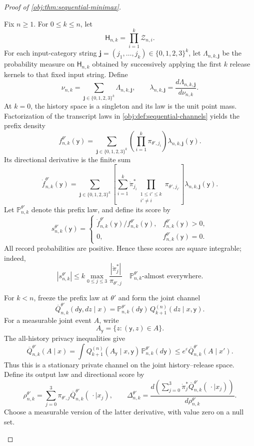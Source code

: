 \begin{proof}[Proof of \cref{obj:thm:sequential-minimax}]
\begin{enumerate}
Fix \(n\ge1\). For \(0\le k\le n\), let
\[
\mathsf H_{n,k}=\prod_{i=1}^{k}\mathcal Z_{n,i}.
\]
For each input-category string
\(\mathbf j=(j_1,\ldots,j_k)\in\{0,1,2,3\}^k\), let
\(\Lambda_{n,k,\mathbf j}\) be the probability measure on \(\mathsf H_{n,k}\) obtained by successively applying the first \(k\) release kernels to that fixed input string. Define
\[
\nu_{n,k}
=
\sum_{\mathbf j\in\{0,1,2,3\}^k}\Lambda_{n,k,\mathbf j},
\qquad
\lambda_{n,k,\mathbf j}
=
\frac{d\Lambda_{n,k,\mathbf j}}{d\nu_{n,k}}.
\]
At \(k=0\), the history space is a singleton and its law is the unit point mass. Factorization of the transcript laws in \cref{obj:def:sequential-channels} yields the prefix density
\[
f_{n,k}^{\theta'}(\mathsf y)
=
\sum_{\mathbf j\in\{0,1,2,3\}^k}
\left(\prod_{i=1}^{k}\pi_{\theta',j_i}\right)
\lambda_{n,k,\mathbf j}(\mathsf y).
\]
Its directional derivative is the finite sum
\[
\dot f_{n,k}^{\theta'}(\mathsf y)
=
\sum_{\mathbf j\in\{0,1,2,3\}^k}
\left[
\sum_{i=1}^{k}
\dot\pi_{j_i}^*
\prod_{\substack{1\le i'\le k\\i'\ne i}}
\pi_{\theta',j_{i'}}
\right]
\lambda_{n,k,\mathbf j}(\mathsf y).
\]
Let \(\mathbb P_{n,k}^{\theta'}\) denote this prefix law, and define its score by
\[
s_{n,k}^{\theta'}(\mathsf y)
=
\begin{cases}
\dot f_{n,k}^{\theta'}(\mathsf y)/f_{n,k}^{\theta'}(\mathsf y),
&f_{n,k}^{\theta'}(\mathsf y)>0,\\
0,&f_{n,k}^{\theta'}(\mathsf y)=0.
\end{cases}
\]
All record probabilities are positive. Hence these scores are square integrable; indeed,
\[
|s_{n,k}^{\theta'}|
\le
k\max_{0\le j\le3}
\frac{|\dot\pi_j^*|}{\pi_{\theta',j}}
\quad
\mathbb P_{n,k}^{\theta'}\text{-almost everywhere}.
\]

For \(k<n\), freeze the prefix law at \(\theta'\) and form the joint channel
\[
\overline Q_{n,k}^{\theta'}(d\mathsf y,dz\mid x)
=
\mathbb P_{n,k}^{\theta'}(d\mathsf y)\,
Q_{k+1}^{(n)}(dz\mid x,\mathsf y).
\]
For a measurable joint event \(A\), write
\[
A_{\mathsf y}=\{z:(\mathsf y,z)\in A\}.
\]
The all-history privacy inequalities give
\[
\overline Q_{n,k}^{\theta'}(A\mid x)
=
\int Q_{k+1}^{(n)}(A_{\mathsf y}\mid x,\mathsf y)
\,\mathbb P_{n,k}^{\theta'}(d\mathsf y)
\le
e^\varepsilon\overline Q_{n,k}^{\theta'}(A\mid x').
\]
Thus this is a stationary private channel on the joint history--release space. Define its output law and directional score by
\[
\rho_{n,k}^{\theta'}
=
\sum_{j=0}^3
\pi_{\theta',j}\overline Q_{n,k}^{\theta'}(\,\cdot\mid x_j),
\qquad
\Delta_{n,k}^{\theta'}
=
\frac{d\left(\sum_{j=0}^3
\dot\pi_j^*\overline Q_{n,k}^{\theta'}(\,\cdot\mid x_j)\right)}
{d\rho_{n,k}^{\theta'}}.
\]
Choose a measurable version of the latter derivative, with value zero on a null set.


\end{enumerate}
\end{proof}
